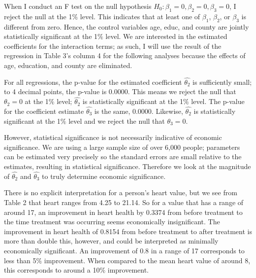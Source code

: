 \documentclass[a4paper]{article}
\begin{document}
When I conduct an F test on the null hypothesis $H_{0}: \beta_{1} = 0, \beta_{2} = 0, \beta_{3} = 0$, I reject the null at the 1$\%$ level. This indicates that at least one of $\beta_{1}$, $\beta_{2}$, or $\beta_{3}$ is different from zero. Hence, the control variables age, educ, and county are jointly statistically significant at the 1$\%$ level. We are interested in the estimated coefficients for the interaction terms; as such, I will use the result of the regression in Table 3's column 4 for the following analyses because the effects of age, education, and county are eliminated.

For all regressions, the p-value for the estimated coefficient $\hat{\theta_2}$ is sufficiently small; to 4 decimal points, the p-value is 0.0000. This means we reject the null that $\theta_2 = 0$ at the 1$\%$ level; $\hat{\theta_2}$ is statistically significant at the 1$\%$ level. The p-value for the coefficient estimate $\hat{\theta_3}$ is the same, 0.0000. Likewise, $\hat{\theta_2}$ is statistically significant at the 1$\%$ level and we reject the null that $\theta_3 = 0$.

However, statistical significance is not necessarily indicative of economic significance. We are using a large sample size of over 6,000 people; parameters can be estimated very precisely so the standard errors are small relative to the estimates, resulting in statistical significance. Therefore we look at the magnitude of $\hat{\theta_2}$ and $\hat{\theta_3}$ to truly determine economic significance.

There is no explicit interpretation for a person's heart value, but we see from Table 2 that heart ranges from 4.25 to 21.14. So for a value that has a range of around 17, an improvement in heart health by 0.3374 from before treatment to the time treatment was occurring seems economically insignificant. The improvement in heart health of 0.8154 from before treatment to after treatment is more than double this, however, and could be interpreted as minimally economically significant. An improvement of 0.8 in a range of 17 corresponds to less than 5$\%$ improvement. When compared to the mean heart value of around 8, this corresponds to around a 10$\%$ improvement.
\end{document}
